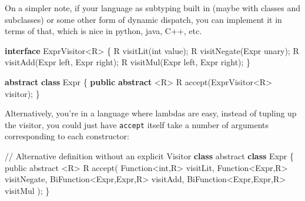 \documentclass[]{article}
\newenvironment{Shaded}{}{}
\newcommand{\DataTypeTok}[1]{\textcolor[rgb]{0.56,0.13,0.00}{#1}}
\newcommand{\FunctionTok}[1]{\textcolor[rgb]{0.02,0.16,0.49}{#1}}
\newcommand{\KeywordTok}[1]{\textcolor[rgb]{0.00,0.44,0.13}{\textbf{#1}}}
\newcommand{\NormalTok}[1]{#1}
\newcommand{\OperatorTok}[1]{\textcolor[rgb]{0.40,0.40,0.40}{#1}}
\begin{document}
On a simpler note, if your language as subtyping built in (maybe with classes
and subclasses) or some other form of dynamic dispatch, you can implement it in
terms of that, which is nice in python, java, C++, etc.

\begin{Shaded}
\begin{Highlighting}[]
\KeywordTok{interface}\NormalTok{ ExprVisitor}\OperatorTok{\textless{}}\NormalTok{R}\OperatorTok{\textgreater{}} \OperatorTok{\{}
\NormalTok{    R }\FunctionTok{visitLit}\OperatorTok{(}\DataTypeTok{int}\NormalTok{ value}\OperatorTok{);}
\NormalTok{    R }\FunctionTok{visitNegate}\OperatorTok{(}\NormalTok{Expr unary}\OperatorTok{);}
\NormalTok{    R }\FunctionTok{visitAdd}\OperatorTok{(}\NormalTok{Expr left}\OperatorTok{,}\NormalTok{ Expr right}\OperatorTok{);}
\NormalTok{    R }\FunctionTok{visitMul}\OperatorTok{(}\NormalTok{Expr left}\OperatorTok{,}\NormalTok{ Expr right}\OperatorTok{);}
\OperatorTok{\}}

\KeywordTok{abstract} \KeywordTok{class}\NormalTok{ Expr }\OperatorTok{\{}
    \KeywordTok{public} \KeywordTok{abstract} \OperatorTok{\textless{}}\NormalTok{R}\OperatorTok{\textgreater{}}\NormalTok{ R }\FunctionTok{accept}\OperatorTok{(}\NormalTok{ExprVisitor}\OperatorTok{\textless{}}\NormalTok{R}\OperatorTok{\textgreater{}}\NormalTok{ visitor}\OperatorTok{);}
\OperatorTok{\}}
\end{Highlighting}
\end{Shaded}

Alternatively, you're in a language where lambdas are easy, instead of tupling
up the visitor, you could just have \texttt{accept} itself take a number of
arguments corresponding to each constructor:

\begin{Shaded}
\begin{Highlighting}[]
\OperatorTok{//} \DataTypeTok{Alternative}\NormalTok{ definition without an explicit }\DataTypeTok{Visitor} \KeywordTok{class}
\NormalTok{abstract }\KeywordTok{class} \DataTypeTok{Expr}\NormalTok{ \{}
\NormalTok{    public abstract }\OperatorTok{\textless{}}\DataTypeTok{R}\OperatorTok{\textgreater{}} \DataTypeTok{R}\NormalTok{ accept(}
        \DataTypeTok{Function}\OperatorTok{\textless{}}\NormalTok{int,}\DataTypeTok{R}\OperatorTok{\textgreater{}}\NormalTok{ visitLit,}
        \DataTypeTok{Function}\OperatorTok{\textless{}}\DataTypeTok{Expr}\NormalTok{,}\DataTypeTok{R}\OperatorTok{\textgreater{}}\NormalTok{ visitNegate,}
        \DataTypeTok{BiFunction}\OperatorTok{\textless{}}\DataTypeTok{Expr}\NormalTok{,}\DataTypeTok{Expr}\NormalTok{,}\DataTypeTok{R}\OperatorTok{\textgreater{}}\NormalTok{ visitAdd,}
        \DataTypeTok{BiFunction}\OperatorTok{\textless{}}\DataTypeTok{Expr}\NormalTok{,}\DataTypeTok{Expr}\NormalTok{,}\DataTypeTok{R}\OperatorTok{\textgreater{}}\NormalTok{ visitMul}
\NormalTok{    );}
\NormalTok{\}}
\end{Highlighting}
\end{Shaded}
\end{document}
